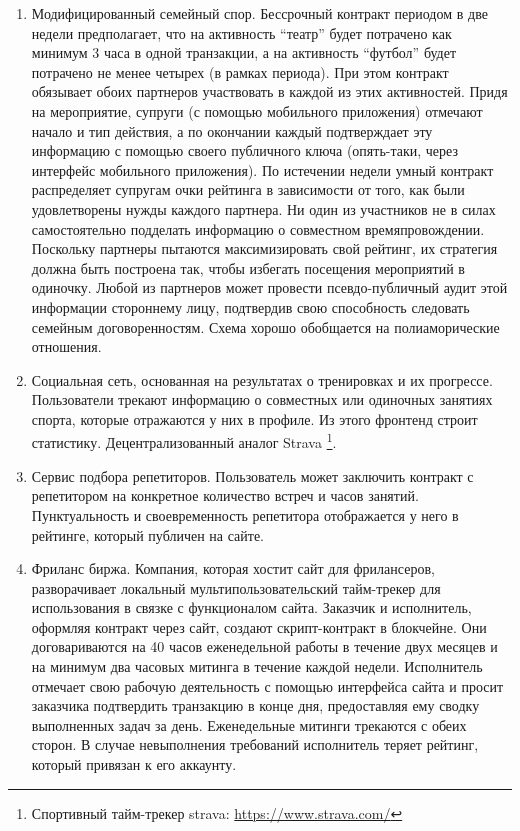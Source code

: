 \documentclass[specification,annotation]{itmo-student-thesis}
\begin{document}
\begin{enumerate}
  \item Модифицированный семейный спор. Бессрочный контракт периодом в
    две недели предполагает, что на активность ``театр'' будет
    потрачено как минимум 3 часа в одной транзакции, а на активность
    ``футбол'' будет потрачено не менее четырех (в рамках
    периода). При этом контракт обязывает обоих партнеров участвовать
    в каждой из этих активностей. Придя на мероприятие, супруги (с
    помощью мобильного приложения) отмечают начало и тип действия, а
    по окончании каждый подтверждает эту информацию с помощью своего
    публичного ключа (опять-таки, через интерфейс мобильного
    приложения). По истечении недели умный контракт распределяет
    супругам очки рейтинга в зависимости от того, как были
    удовлетворены нужды каждого партнера. Ни один из участников не в
    силах самостоятельно подделать информацию о совместном
    времяпровождении. Поскольку партнеры пытаются максимизировать свой
    рейтинг, их стратегия должна быть построена так, чтобы избегать
    посещения мероприятий в одиночку. Любой из партнеров может
    провести псевдо-публичный аудит этой информации стороннему лицу,
    подтвердив свою способность следовать семейным
    договоренностям. Схема хорошо обобщается на полиаморические
    отношения.
  \item Социальная сеть, основанная на результатах о тренировках и их
    прогрессе. Пользователи трекают информацию о совместных или
    одиночных занятиях спорта, которые отражаются у них в профиле. Из
    этого фронтенд строит статистику. Децентрализованный аналог
    Strava \footnote{Спортивный тайм-трекер strava:
      \url{https://www.strava.com/}}.
  \item Сервис подбора репетиторов. Пользователь может заключить
    контракт с репетитором на конкретное количество встреч и часов
    занятий. Пунктуальность и своевременность репетитора отображается
    у него в рейтинге, который публичен на сайте.
  \item Фриланс биржа. Компания, которая хостит сайт для фрилансеров,
    разворачивает локальный мультипользовательский тайм-трекер для
    использования в связке с функционалом сайта. Заказчик и
    исполнитель, оформляя контракт через сайт, создают скрипт-контракт
    в блокчейне. Они договариваются на 40 часов еженедельной работы в
    течение двух месяцев и на минимум два часовых митинга в течение
    каждой недели. Исполнитель отмечает свою рабочую деятельность с
    помощью интерфейса сайта и просит заказчика подтвердить транзакцию
    в конце дня, предоставляя ему сводку выполненных задач за
    день. Еженедельные митинги трекаются с обеих сторон. В случае
    невыполнения требований исполнитель теряет рейтинг, который
    привязан к его аккаунту.
\end{enumerate}
\end{document}
